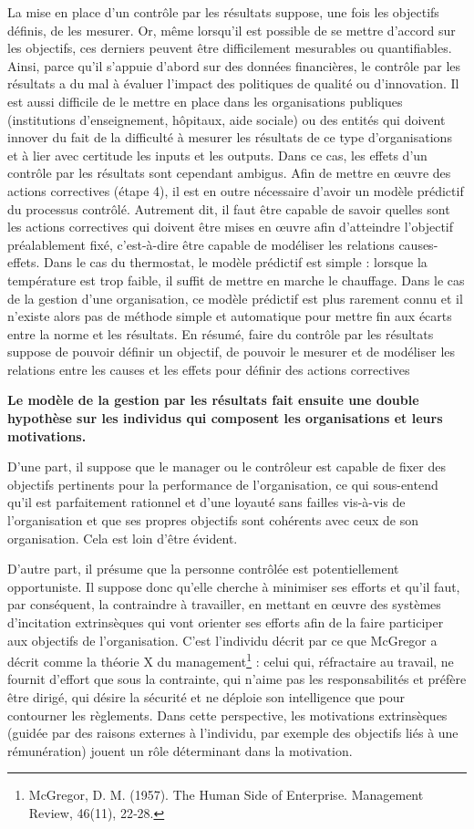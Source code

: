\documentclass[oneside]{kaobook}
\begin{document}
La mise en place d’un contrôle par les résultats suppose, une fois les objectifs définis, de les mesurer. Or, même lorsqu’il est possible de se mettre d’accord sur les objectifs, ces derniers peuvent être difficilement mesurables ou quantifiables. Ainsi, parce qu’il s’appuie d’abord sur des données financières, le contrôle par les résultats a du mal à évaluer l’impact des politiques de qualité ou d’innovation. Il est aussi difficile de le mettre en place dans les organisations publiques (institutions d’enseignement, hôpitaux, aide sociale) ou des entités qui doivent innover du fait de la difficulté à mesurer les résultats de ce type d’organisations et à lier avec certitude les inputs et les outputs. Dans ce cas, les effets d’un contrôle par les résultats sont cependant ambigus. Afin de mettre en œuvre des actions correctives (étape 4), il est en outre nécessaire d’avoir un modèle prédictif du processus contrôlé. Autrement dit, il faut être capable de savoir quelles sont les actions correctives qui doivent être mises en œuvre afin d’atteindre l’objectif préalablement fixé, c’est-à-dire être capable de modéliser les relations causes-effets. Dans le cas du thermostat, le modèle prédictif est simple : lorsque la température est trop faible, il suffit de mettre en marche le chauffage. Dans le cas de la gestion d’une organisation, ce modèle prédictif est plus rarement connu et il n’existe alors pas de méthode simple et automatique pour mettre fin aux écarts entre la norme et les résultats.
En résumé, faire du contrôle par les résultats suppose de pouvoir définir un objectif, de pouvoir le mesurer et de modéliser les relations entre les causes et les effets pour définir des actions correctives

\textbf{Le modèle de la gestion par les résultats fait ensuite une double hypothèse sur les individus qui composent les organisations et leurs motivations.}

D’une part, il suppose que le manager ou le contrôleur est capable de fixer des objectifs pertinents pour la performance de l’organisation, ce qui sous-entend qu'il est parfaitement rationnel et d’une loyauté sans failles vis-à-vis de l’organisation et que ses propres objectifs sont cohérents avec ceux de son organisation. Cela est loin d’être évident.

D’autre part, il présume que la personne contrôlée est potentiellement opportuniste. Il suppose donc qu’elle cherche à minimiser ses efforts et qu’il faut, par conséquent, la contraindre à travailler, en mettant en œuvre des systèmes d’incitation extrinsèques qui vont orienter ses efforts afin de la faire participer aux objectifs de l’organisation. C’est l’individu décrit par ce que McGregor a décrit comme la théorie X du management\footnote{McGregor, D. M. (1957). The Human Side of Enterprise. Management Review, 46(11), 22‑28.} : celui qui, réfractaire au travail, ne fournit d’effort que sous la contrainte, qui n’aime pas les responsabilités et préfère être dirigé, qui désire la sécurité et ne déploie son intelligence que pour contourner les règlements.
Dans cette perspective, les motivations extrinsèques (guidée par des raisons externes à l’individu, par exemple des objectifs liés à une rémunération) jouent un rôle déterminant dans la motivation.
\end{document}
